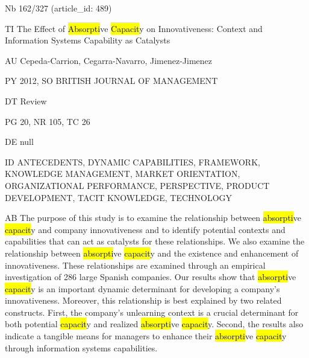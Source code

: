 \documentclass[a4paper]{article}
\begin{document}
\vspace*{-2cm}
Nb \tabto{0cm}162/327 (article\_id: 489)\par
TI \tabto{0cm}The Effect of \hl{Absorpti}ve \hl{Capacit}y on Innovativeness: Context and Information Systems Capability as Catalysts\par
AU \tabto{0cm}Cepeda-Carrion, Cegarra-Navarro, Jimenez-Jimenez\par
PY \tabto{0cm}2012, SO BRITISH JOURNAL OF MANAGEMENT\par
DT \tabto{0cm}Review\par
PG \tabto{0cm}20, NR 105, TC 26\par
DE \tabto{0cm}null\par
ID \tabto{0cm}ANTECEDENTS, DYNAMIC CAPABILITIES, FRAMEWORK, KNOWLEDGE MANAGEMENT, MARKET ORIENTATION, ORGANIZATIONAL PERFORMANCE, PERSPECTIVE, PRODUCT DEVELOPMENT, TACIT KNOWLEDGE, TECHNOLOGY\par
AB \tabto{0cm}The purpose of this study is to examine the relationship between \hl{absorpti}ve \hl{capacit}y and company innovativeness and to identify potential contexts and capabilities that can act as catalysts for these relationships. We also examine the relationship between \hl{absorpti}ve \hl{capacit}y and the existence and enhancement of innovativeness. These relationships are examined through an empirical investigation of 286 large Spanish companies. Our results show that \hl{absorpti}ve \hl{capacit}y is an important dynamic determinant for developing a company's innovativeness. Moreover, this relationship is best explained by two related constructs. First, the company's unlearning context is a crucial determinant for both potential \hl{capacit}y and realized \hl{absorpti}ve \hl{capacit}y. Second, the results also indicate a tangible means for managers to enhance their \hl{absorpti}ve \hl{capacit}y through information systems capabilities.\par
\clearpage
\end{document}
